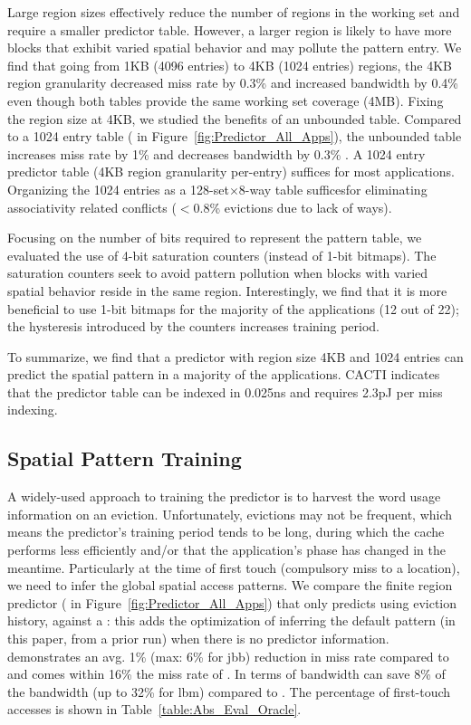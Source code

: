 {{Large region sizes effectively reduce the number of regions in the working set and require a smaller predictor table. However, a larger region is likely to have more blocks that exhibit varied spatial behavior and may pollute the pattern entry.  We find that going from 1KB (4096 entries) to 4KB (1024 entries) regions, the 4KB region granularity decreased miss rate by 0.3\% and increased bandwidth by 0.4\% even though both tables provide the same working set coverage (4MB).  Fixing the region size at 4KB, we studied the benefits of an unbounded table.  Compared to a 1024 entry table ( in Figure~\ref{fig:Predictor_All_Apps}), the unbounded table increases miss rate by 1\% and decreases bandwidth by 0.3\% . A 1024 entry predictor table (4KB region granularity per-entry) suffices for most applications. Organizing the 1024 entries as a 128-set$\times$8-way table sufficesfor eliminating associativity related conflicts ($<$0.8\% evictions due to lack of ways).

Focusing on the number of bits required to represent the pattern table, we evaluated the use of 4-bit saturation counters (instead of 1-bit bitmaps). The saturation counters seek to avoid pattern pollution when blocks with varied spatial behavior reside in the same region. Interestingly, we find that it is more beneficial to use 1-bit bitmaps for the majority of the applications (12 out of 22); the hysteresis introduced by the counters increases training period.  

To summarize, we find that a  predictor with region size 4KB and 1024 entries can predict the spatial pattern in a majority of the applications. CACTI indicates that the predictor table can be indexed in 0.025ns and requires 2.3pJ per miss indexing.

\subsection{Spatial Pattern Training} 

A widely-used approach to training the predictor is to harvest the word usage information on an eviction. Unfortunately, evictions may not be frequent, which means the predictor's training period tends to be long, during which the cache performs less efficiently and/or that the application's phase has changed in the meantime. Particularly at the time of first touch (compulsory miss to a location), we need to infer the global spatial access patterns. We compare the finite region predictor ( in Figure~\ref{fig:Predictor_All_Apps}) that only predicts using eviction history, against a : this adds the optimization of inferring the default pattern (in this paper, from a prior run) when there is no predictor information.  demonstrates an avg. 1\% (max: 6\% for jbb) reduction in miss rate compared to  and comes within 16\% the miss rate of . In terms of bandwidth  can save 8\% of the bandwidth (up to 32\% for lbm) compared to . The percentage of first-touch accesses is shown in Table~\ref{table:Abs_Eval_Oracle}.  

}}
